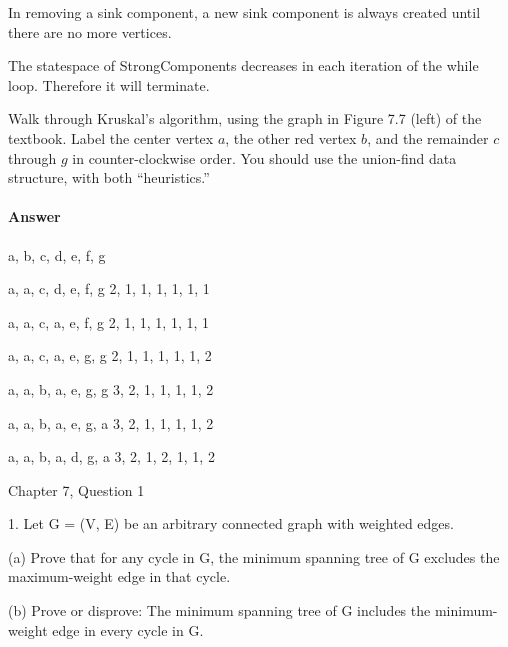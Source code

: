 \documentclass{article}
\begin{document}
In removing a sink component, a new sink component is always created until there
are no more vertices.

The statespace of StrongComponents decreases in each iteration of the while loop.
Therefore it will terminate.

\collab{}

Walk through Kruskal's algorithm, using the graph in Figure 7.7 (left) of the
textbook.  Label the center vertex $a$, the other red vertex $b$, and the
remainder $c$ through $g$ in counter-clockwise order.  You should use the
union-find data structure, with both ``heuristics.''

\paragraph{Answer}

a, b, c, d, e, f, g

a, a, c, d, e, f, g
2, 1, 1, 1, 1, 1, 1

a, a, c, a, e, f, g
2, 1, 1, 1, 1, 1, 1

a, a, c, a, e, g, g
2, 1, 1, 1, 1, 1, 2

a, a, b, a, e, g, g
3, 2, 1, 1, 1, 1, 2

a, a, b, a, e, g, a
3, 2, 1, 1, 1, 1, 2

a, a, b, a, d, g, a
3, 2, 1, 2, 1, 1, 2

\todo{}

\collab{}

Chapter 7, Question 1

1. Let G = (V, E) be an arbitrary connected graph with weighted edges.

(a) Prove that for any cycle in G, the minimum spanning tree of G excludes
the maximum-weight edge in that cycle.

(b) Prove or disprove: The minimum spanning tree of G includes the
minimum-weight edge in every cycle in G.
\end{document}
